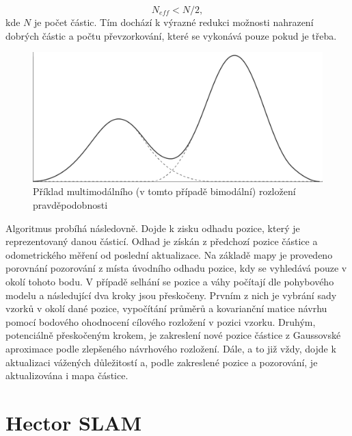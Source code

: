 \documentclass[12pt]{report}
\begin{document}
\begin{equation}
	N_{eff} < N/2,
\end{equation}
kde $N$ je počet částic. Tím dochází k výrazné redukci možnosti nahrazení dobrých částic a počtu převzorkování, které se vykonává pouze pokud je třeba.\\
\begin{figure}[!ht]
	\begin{center}
		\includegraphics[width=0.7\columnwidth]{imgs/multimodal.png}
	\end{center}
	\caption{Příklad multimodálního (v tomto případě bimodální) rozložení pravděpodobnosti}
	\label{fig:multimodal}
\end{figure}
\indent Algoritmus probíhá následovně. Dojde k zisku odhadu pozice, který je reprezentovaný danou částicí. Odhad je získán z předchozí pozice částice a odometrického měření od poslední aktualizace. Na základě mapy je provedeno porovnání pozorování z místa úvodního odhadu pozice, kdy se vyhledává pouze v okolí tohoto bodu. V případě selhání se pozice a váhy počítají dle pohybového modelu a následující dva kroky jsou přeskočeny. Prvním z nich je vybrání sady vzorků v okolí dané pozice, vypočítání průměrů a kovarianční matice návrhu pomocí bodového ohodnocení cílového rozložení v pozici vzorku. Druhým, potenciálně přeskočeným krokem, je zakreslení nové pozice částice z Gaussovské aproximace podle zlepšeného návrhového rozložení. Dále, a to již vždy, dojde k aktualizaci vážených důležitostí a, podle zakreslené pozice a pozorování, je aktualizována i mapa částice. 
 
\newpage

\section{Hector SLAM}
\end{document}
